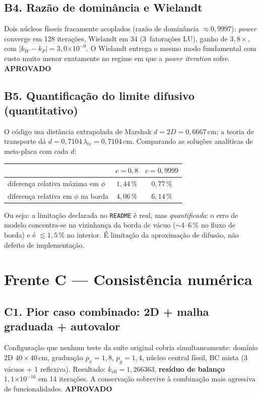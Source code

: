 \documentclass[11pt,a4paper]{article}
\newcommand{\keff}{k_{\text{eff}}}
\newcommand{\aprovado}{\textcolor{green!45!black}{\textbf{APROVADO}}}
\newcommand{\e}[1]{\ensuremath{\times 10^{#1}}}
\begin{document}
\subsection{B4. Razão de dominância e Wielandt}
Dois núcleos físseis fracamente acoplados (razão de dominância
$\approx 0{,}9997$): \emph{power} converge em 128 iterações, Wielandt em 34
(3~fatorações LU), ganho de $3{,}8\times$, com
$|k_W - k_P| = 3{,}0\e{-9}$. O Wielandt entrega o mesmo modo fundamental com
custo muito menor exatamente no regime em que a \emph{power iteration} sofre.
\hfill \aprovado

\subsection{B5. Quantificação do limite difusivo (quantitativo)}
O código usa distância extrapolada de Marshak $d = 2D = 0{,}6667$\,cm; a
teoria de transporte dá $d = 0{,}7104\,\lambda_{tr} = 0{,}7104$\,cm. Comparando
as soluções analíticas de meia-placa com cada $d$:

\begin{center}\small
\begin{tabular}{lcc}
\toprule
 & $c = 0{,}8$ & $c = 0{,}9999$ \\
\midrule
diferença relativa máxima em $\phi$ & $1{,}44\,\%$ & $0{,}77\,\%$ \\
diferença relativa em $\phi$ na borda & $4{,}06\,\%$ & $6{,}14\,\%$ \\
\bottomrule
\end{tabular}
\end{center}
Ou seja: a limitação declarada no \texttt{README} é real, mas
\emph{quantificada}: o erro de modelo concentra-se na vizinhança da borda de
vácuo ($\sim$4--6\,\% no fluxo de borda) e é $\lesssim 1{,}5\,\%$ no interior.
É limitação da aproximação de difusão, não defeito de implementação.

\section{Frente C --- Consistência numérica}

\subsection{C1. Pior caso combinado: 2D + malha graduada + autovalor}
Configuração que nenhum teste da suíte original cobria simultaneamente:
domínio 2D $40\times40$\,cm, graduação $p_x=1{,}8$, $p_y=1{,}4$, núcleo
central físsil, BC mista (3 vácuos + 1 reflexiva). Resultado:
$\keff = 1{,}266363$, \textbf{resíduo de balanço $1{,}1\e{-16}$} em 14
iterações. A conservação sobrevive à combinação mais agressiva de
funcionalidades. \hfill \aprovado
\end{document}
